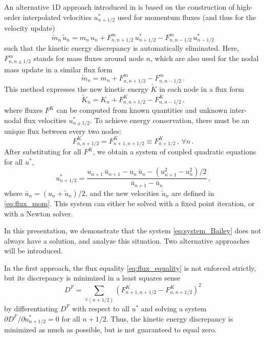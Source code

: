 \documentclass{report}
\begin{document}
An alternative 1D approach introduced in \cite{Bailey:vel_remap} is based
on the construction of high-order interpolated velocities $u^*_{n+1/2}$
used for momentum fluxes (and thus for the velocity update)
\begin{equation}
\label{eq:flux_mom}
\tilde{m}_{n}\, \tilde{u}_{n} = m_n\, u_n
+ F^{m}_{n,n+1/2}\, u^*_{n+1/2}
- F^{m}_{n,n-1/2}\, u^*_{n-1/2}
\end{equation}
such that the kinetic energy discrepancy is automatically eliminated.
Here, $F^{m}_{n,n\pm 1/2}$ stands for mass fluxes around node $n$, which
are also used for the nodal mass update in a similar flux form
\begin{equation}
\label{eq:flux_mass}
\tilde{m}_{n} = m_n + F^{m}_{n,n+1/2} - F^{m}_{n,n-1/2}
\,\mbox{.}
\end{equation}
This method expresses the new kinetic energy $\tilde{K}$ in each node in a flux form
\begin{equation}
\label{eq:flux_form}
\tilde{K}_{n} = K_n + F^{K}_{n,n+1/2}
- F^{K}_{n,n-1/2} \,\mbox{,}
\end{equation}
where fluxes $F^{K}$ can be computed from known quantities and
unknown inter-nodal flux velocities $u^*_{n \pm 1/2}$. To achieve energy
conservation, there must be an unique flux between every two nodes:
\begin{equation}
\label{eq:flux_equality}
F^{K}_{n,n+1/2} = F^{K}_{n+1,n+1/2} \equiv F^{K}_{n+1/2}
\,\mbox{,}\,\, \forall n
\,\mbox{.}
\end{equation}
After substituting for all $F^{K}$, we obtain a system of coupled
quadratic equations for all $u^*$,
\begin{equation}
\label{eq:system_Bailey}
u^{*}_{n+1/2} = \frac{ u_{n+1}\, \bar{u}_{n+1}
- u_{n} \, \bar{u}_{n}
- \left(u_{n+1}^2-u_{n}^2\right)/2}
{\bar{u}_{n+1} - \bar{u}_{n}}
\,\mbox{,}
\end{equation}
where $\bar{u}_n = (u_n + \tilde{u}_n)/2$, and the new velocities
$\tilde{u}_n$ are defined in \eqref{eq:flux_mom}. This system can
either be solved with a fixed point iteration, or with a Newton
solver.

In this presentation, we demonstrate that the system
\eqref{eq:system_Bailey} does not always have a solution, and analyze
this situation. Two alternative approaches will be introduced.

In the first approach, the flux equality \eqref{eq:flux_equality} is not
enforced strictly, but its discrepancy is minimized in a least squares
sense
\begin{equation}
\label{eq:appr_1}
D^{F} = \sum\limits_{\forall (n+1/2)} (F^{K}_{n+1,n+1/2} - F^{K}_{n,n+1/2})^2
\end{equation}
by differentiating $D^{F}$ with respect to all $u^*$ and solving a system
$\partial D^F / \partial u^*_{n+1/2} = 0$ for all $n+1/2$. Thus, the
kinetic energy discrepancy is minimized as much as possible, but is not
guaranteed to equal zero.
\end{document}
